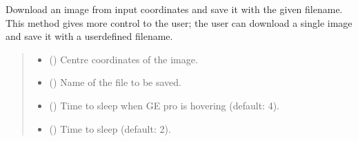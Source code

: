 \documentclass[letterpaper,10pt,english]{sphinxmanual}
\begin{document}
\begin{fulllineitems}
\label{\detokenize{index:gebot.ImageDownloader.download_image}}
\pysigstartsignatures
{}
\pysigstopsignatures
\sphinxAtStartPar
Download an image from input coordinates and save it with the given filename. This method gives more control to the user; the user can download a single image and save it with a user\sphinxhyphen{}defined filename.
\begin{quote}\begin{description}
\begin{itemize}
\item {} 
\sphinxAtStartPar
{} () \textendash{} Centre coordinates of the image.

\item {} 
\sphinxAtStartPar
{} () \textendash{} Name of the file to be saved.

\item {} 
\sphinxAtStartPar
{} (\sphinxstyleliteralemphasis{\sphinxupquote{, }}) \textendash{} Time to sleep when GE pro is hovering (default: 4).

\item {} 
\sphinxAtStartPar
{} (\sphinxstyleliteralemphasis{\sphinxupquote{, }}) \textendash{} Time to sleep (default: 2).

\end{itemize}

\end{description}\end{quote}

\end{fulllineitems}
\end{document}
